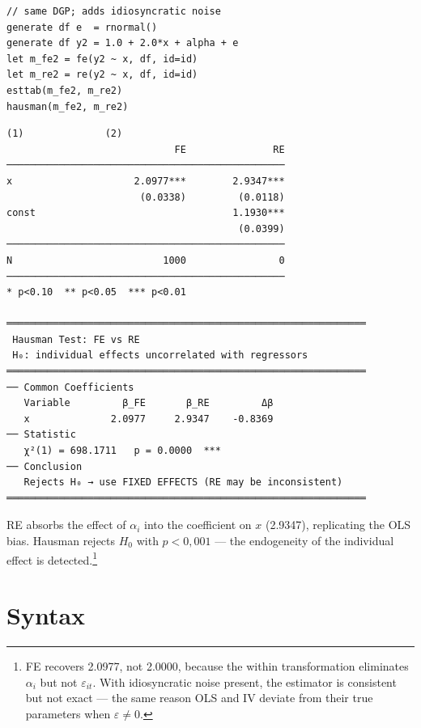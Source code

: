 \begin{lstlisting}[caption={Hausman --- FE vs RE with correlated effect}]
// same DGP; adds idiosyncratic noise
generate df e  = rnormal()
generate df y2 = 1.0 + 2.0*x + alpha + e
let m_fe2 = fe(y2 ~ x, df, id=id)
let m_re2 = re(y2 ~ x, df, id=id)
esttab(m_fe2, m_re2)
hausman(m_fe2, m_re2)
\end{lstlisting}

\begin{lstlisting}[language={}, basicstyle=\ttfamily\small,
  frame=none, numbers=none, backgroundcolor=\color{codbg},
  xleftmargin=0pt, xrightmargin=0pt, breaklines=false]
                            (1)              (2)
                             FE               RE
────────────────────────────────────────────────
x                     2.0977***        2.9347***
                       (0.0338)         (0.0118)
const                                  1.1930***
                                        (0.0399)
────────────────────────────────────────────────
N                          1000                0
────────────────────────────────────────────────
* p<0.10  ** p<0.05  *** p<0.01

══════════════════════════════════════════════════════════════
 Hausman Test: FE vs RE
 H₀: individual effects uncorrelated with regressors
══════════════════════════════════════════════════════════════
── Common Coefficients
   Variable         β_FE       β_RE         Δβ
   x              2.0977     2.9347    -0.8369
── Statistic
   χ²(1) = 698.1711   p = 0.0000  ***
── Conclusion
   Rejects H₀ → use FIXED EFFECTS (RE may be inconsistent)
══════════════════════════════════════════════════════════════
\end{lstlisting}

RE absorbs the effect of $\alpha_i$ into the coefficient on $x$ (2.9347), replicating
the OLS bias. Hausman rejects $H_0$ with $p < 0{,}001$ --- the endogeneity
of the individual effect is detected.\footnote{%
  FE recovers 2.0977, not 2.0000, because the within transformation eliminates
  $\alpha_i$ but not $\varepsilon_{it}$. With idiosyncratic noise present,
  the estimator is consistent but not exact --- the same reason OLS
  and IV deviate from their true parameters when $\varepsilon \neq 0$.}

\section{Syntax}

